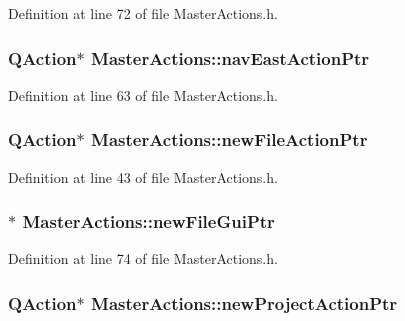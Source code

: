 Definition at line 72 of file Master\-Actions.\-h.

\hypertarget{class_master_actions_aa084a718ec328fbb6645bdb23c995df1}{
\subsubsection[{nav\-East\-Action\-Ptr}]{\setlength{\rightskip}{0pt plus 5cm}Q\-Action$\ast$ Master\-Actions\-::nav\-East\-Action\-Ptr\hspace{0.3cm}{\ttfamily [private]}}}\label{class_master_actions_aa084a718ec328fbb6645bdb23c995df1}


Definition at line 63 of file Master\-Actions.\-h.

\hypertarget{class_master_actions_a4da658e527460b8d5b0a263820259e97}{
\subsubsection[{new\-File\-Action\-Ptr}]{\setlength{\rightskip}{0pt plus 5cm}Q\-Action$\ast$ Master\-Actions\-::new\-File\-Action\-Ptr\hspace{0.3cm}{\ttfamily [private]}}}\label{class_master_actions_a4da658e527460b8d5b0a263820259e97}


Definition at line 43 of file Master\-Actions.\-h.

\hypertarget{class_master_actions_a8839c174acf071c0d9bfe450160218eb}{
\subsubsection[{new\-File\-Gui\-Ptr}]{$\ast$ Master\-Actions\-::new\-File\-Gui\-Ptr\hspace{0.3cm}{\ttfamily [private]}}}\label{class_master_actions_a8839c174acf071c0d9bfe450160218eb}


Definition at line 74 of file Master\-Actions.\-h.

\hypertarget{class_master_actions_a114ab55c27fc183af68ebaaa86748a82}{
\subsubsection[{new\-Project\-Action\-Ptr}]{\setlength{\rightskip}{0pt plus 5cm}Q\-Action$\ast$ Master\-Actions\-::new\-Project\-Action\-Ptr\hspace{0.3cm}{\ttfamily [private]}}}\label{class_master_actions_a114ab55c27fc183af68ebaaa86748a82}


